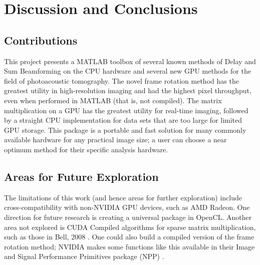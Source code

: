 \chapter{Discussion and Conclusions}
\label{discuss_conclude}

\section{Contributions}
\label{chapter4:contributions}
This project presents a MATLAB toolbox of several known methods of Delay and Sum Beamforming on the CPU hardware and several new GPU methods for the field of photoacoustic tomography. The novel frame rotation method has the greatest utility in high-resolution imaging and had the highest pixel throughput, even when performed in MATLAB (that is, not compiled). The matrix multiplication on a GPU has the greatest utility for real-time imaging, followed by a straight CPU implementation for data sets that are too large for limited GPU storage. This package is a portable and fast solution for many commonly available hardware for any practical image size; a user can choose a near optimum method for their specific analysis hardware.

\section{Areas for Future Exploration}
\label{chapter4:futurework}
The limitations of this work (and hence areas for further exploration) include cross-compatibility with non-NVIDIA GPU devices, such as AMD Radeon. One direction for future research is creating a universal package in OpenCL. Another area not explored is CUDA Compiled algorithms for sparse matrix multiplication, such as those in Bell, 2008 \cite{bellEfficientSparseMatrixVector2008}. One could also build a compiled version of the frame rotation method; NVIDIA makes some functions like this available in their Image and Signal Performance Primitives package (NPP) \cite{NVIDIA2DImage}.